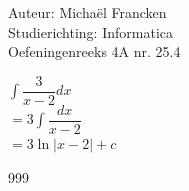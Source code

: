 \documentclass[a4paper]{article}
\newcommand{\dint}{\displaystyle\int}
\begin{document}
\noindent \large Auteur: Michaël Francken \\
\noindent \large Studierichting: Informatica\\
\noindent \large Oefeningenreeks 4A nr. 25.4\\

\medskip

\normalsize

$\dint\dfrac{3}{x-2}dx$\\

$= 3\dint\dfrac{dx}{x-2}$\\

$=3\ln\left|x-2\right|+c$\\

\begin{thebibliography}{999}
\end{thebibliography}
\end{document}
